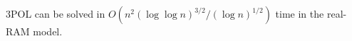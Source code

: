 \begin{theorem}[label=thm:implicit:uniform,restate=TheoremPOLUniformImplicit]%
3POL can be solved in
$O(n^2 {(\log \log n)}^{3/2} / {(\log n)}^{1/2})$
time in the real-RAM model.
\end{theorem}

